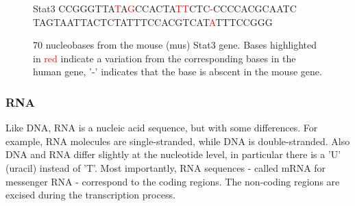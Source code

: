 \begin{figure}[ht]
  \centering
  \begin{SaveVerbatim}[commandchars=\\\{\},codes={\catcode`$=3\catcode`^=7\catcode`_=8}]{Stat3}
CCGGGTTA\textcolor{red}{T}A\textcolor{red}{G}CCACTA\textcolor{red}{TT}CTC\textcolor{red}{-}CCCCACGCAATC
TAGTAATTACTCTATTTCCACGTCAT\textcolor{red}{A}TTTCCGGG
\end{SaveVerbatim}
  \caption[70 nucleobases from the mouse (mus) Stat3 gene.]{70 nucleobases from the mouse (mus) Stat3 gene. Bases highlighted in \textcolor{red}{red} indicate a variation from the corresponding bases in the human gene, '-' indicates that the base is abscent in the mouse gene.}
\end{figure}



\subsubsection{RNA}

Like DNA, RNA is a nucleic acid sequence, but with some differences. For example, RNA molecules are single-stranded, while DNA is double-stranded. Also DNA and RNA differ slightly at the nucleotide level, in particular there is a 'U' (uracil) instead of 'T'. Most importantly, RNA sequences - called mRNA for messenger RNA - correspond to the coding regions. The non-coding regions are excised during the transcription process.

